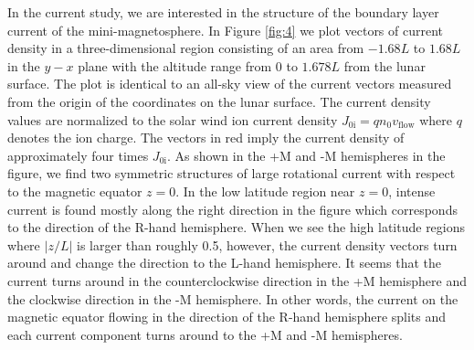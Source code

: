 \documentclass[draft,jgrga]{agutex2015}
\begin{document}
\begin{article}
In the current study, 
we are interested in the structure of the boundary layer current  
of the mini-magnetosphere.
In Figure \ref{fig:4} 
we plot vectors of current density in a three-dimensional region 
consisting of an area from $-1.68L$ to $1.68L$ in the $y-x$ plane
with the altitude range from 0 to $1.678L$ from the lunar surface.
The plot is identical to an all-sky view of the current vectors
measured from the origin of the coordinates on the lunar surface. 
The current density values are normalized to 
the solar wind ion current density $J_\mathrm{0i}=qn_{0}v_{\mathrm{flow}}$
where $q$ denotes the ion charge.
The vectors in red imply the current density of approximately four times $J_\mathrm{0i}$.
As shown in the +M and -M hemispheres in the figure, 
we find two symmetric structures of large rotational current 
with respect to the magnetic equator $z=0$. 
In the low latitude region near $z=0$, 
intense current is found mostly along the right direction in the figure
which corresponds to the direction of the R-hand hemisphere.
When we see the high latitude regions where $|z/L|$ is larger than roughly 0.5,   
however, the current density vectors turn around and change the direction to the L-hand hemisphere. 
It seems that the current turns around in the counterclockwise direction 
in the +M hemisphere and the clockwise direction in the -M hemisphere.
In other words, the current on the magnetic equator flowing in the direction of 
the R-hand hemisphere splits and each current component turns around 
to the +M and -M hemispheres.


\end{article}
\end{document}
